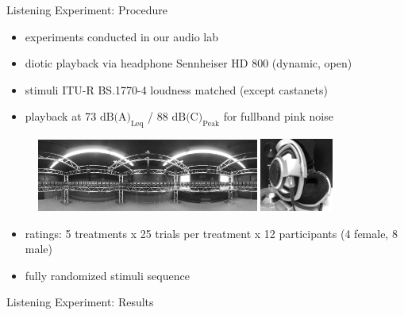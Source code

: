 \documentclass[mathserif]{beamer}
\begin{document}
\begin{frame}{Listening Experiment: Procedure}
\begin{itemize}
\item experiments conducted in our audio lab %
\item diotic playback via \textcolor{colnonzero}{headphone} Sennheiser HD 800 (dynamic, open)
\item stimuli ITU-R BS.1770-4 loudness matched (except castanets)
\item playback at 73 $\text{dB(A)}_\text{Leq}$ / 88 $\text{dB(C)}_\text{Peak}$
for fullband pink noise
\end{itemize}
\begin{figure}
\includegraphics[width=0.65\textwidth]{graphics/URO_array_panorama_2}
\includegraphics[width=0.215\textwidth]{graphics/HD800_2}
\end{figure}
\begin{itemize}
\item ratings: 5 treatments x 25 trials per treatment x 12 participants (4 female, 8 male)
\item fully randomized stimuli sequence
\end{itemize}
\end{frame}
%
%
%
\begin{frame}{Listening Experiment: Results}
\end{frame}
%
%
%
\end{document}

